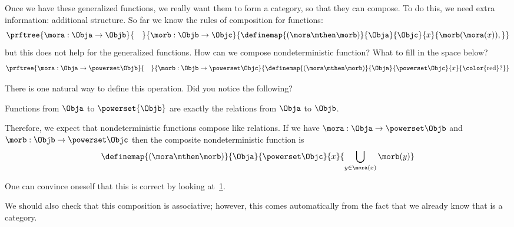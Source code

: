 Once we have these generalized functions, we really want them to form a category, so that they can compose. To do this, we need extra information: additional structure.
So far we know the rules of composition for functions:
% 
\begin{equation}
    \prftree{\mora: \Obja \to \Objb}{\quad}{\morb: \Objb \to \Objc}
    {\definemap{(\mora\mthen\morb)}{\Obja}{\Objc}%
    {x}{\morb(\mora(x)),}}
  \end{equation}
%   
but this does not help for the generalized functions. How can we compose nondeterministic function? What to fill in the space below?
% 
\begin{equation}
    \prftree{\mora: \Obja \to \powerset\Objb}{\quad}{\morb: \Objb \to \powerset \Objc}
    {\definemap{(\mora\mthen\morb)}{\Obja}{\powerset\Objc}%
    {x}{\text{\color{red}?}}}
  \end{equation}

There is one natural way to define this operation. 
Did you notice the following?

\begin{lemma}
Functions from $\Obja$ to $\powerset{\Objb}$ are exactly the relations from $\Obja$ to $\Objb$.
\end{lemma}


Therefore, we expect that nondeterministic functions compose like relations.
If we have $\mora: \Obja \to \powerset\Objb$ and $\morb: \Objb \to \powerset \Objc$ then the composite nondeterministic function is 
%
\begin{equation}\label{eq:fish-nondet}
    \definemap{(\mora\mthen\morb)}{\Obja}{\powerset\Objc}%
    {x}{ \displaystyle \bigcup_{y\in \mora(x)}\morb(y)}
\end{equation}

One can convince oneself that this is correct by looking at~\cref{fig:mapping-nondeterministic}.

\begin{figure}[h]
    \caption{}
    \label{fig:mapping-nondeterministic}
\end{figure}

We should also check that this composition is associative; however, this comes automatically from the fact that we already know that \Rel is a category. 

